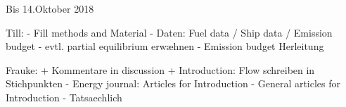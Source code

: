 Bis 14.Oktober 2018

Till:
- Fill methods and Material
- Daten: Fuel data / Ship data / Emission budget
- evtl. partial equilibrium erwæhnen
- Emission budget Herleitung

Frauke:
+ Kommentare in discussion
+ Introduction: Flow schreiben in Stichpunkten
- Energy journal: Articles for Introduction
- General articles for Introduction
- Tatsaechlich
